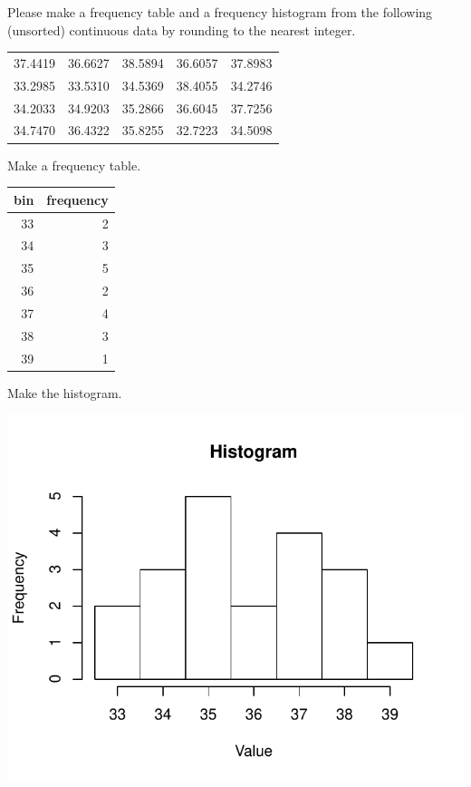 
\begin{question}
Please make a frequency table and a frequency histogram from the
following (unsorted) continuous data by rounding to the nearest integer.

\begin{longtable}[]{@{}rrrrr@{}}
\toprule
\endhead
37.4419 & 36.6627 & 38.5894 & 36.6057 & 37.8983\tabularnewline
33.2985 & 33.5310 & 34.5369 & 38.4055 & 34.2746\tabularnewline
34.2033 & 34.9203 & 35.2866 & 36.6045 & 37.7256\tabularnewline
34.7470 & 36.4322 & 35.8255 & 32.7223 & 34.5098\tabularnewline
\bottomrule
\end{longtable}
\end{question}

\begin{solution}
Make a frequency table.

\begin{longtable}[]{@{}rr@{}}
\toprule
bin & frequency\tabularnewline
\midrule
\endhead
33 & 2\tabularnewline
34 & 3\tabularnewline
35 & 5\tabularnewline
36 & 2\tabularnewline
37 & 4\tabularnewline
38 & 3\tabularnewline
39 & 1\tabularnewline
\bottomrule
\end{longtable}

Make the histogram.

\includegraphics{barchart-1.pdf}\\
\end{solution}

